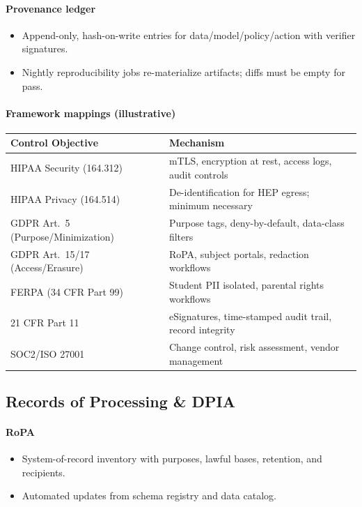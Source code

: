 \documentclass[11pt]{article}
\theoremstyle{plain}
\begin{document}
\paragraph{Provenance ledger}
\begin{itemize}
  \item Append-only, hash-on-write entries for data/model/policy/action with verifier signatures.
  \item Nightly reproducibility jobs re-materialize artifacts; diffs must be empty for pass.
\end{itemize}

\paragraph{Framework mappings (illustrative)}
\begin{center}
\begin{tabular}{l l}
\hline
\textbf{Control Objective} & \textbf{Mechanism} \\
\hline
HIPAA Security (164.312) & mTLS, encryption at rest, access logs, audit controls \\
HIPAA Privacy (164.514) & De-identification for HEP egress; minimum necessary \\
GDPR Art.~5 (Purpose/Minimization) & Purpose tags, deny-by-default, data-class filters \\
GDPR Art.~15/17 (Access/Erasure) & RoPA, subject portals, redaction workflows \\
FERPA (34 CFR Part 99) & Student PII isolated, parental rights workflows \\
21 CFR Part 11 & eSignatures, time-stamped audit trail, record integrity \\
SOC2/ISO 27001 & Change control, risk assessment, vendor management \\
\hline
\end{tabular}
\end{center}

\subsection{Records of Processing \& DPIA}
\paragraph{RoPA}
\begin{itemize}
  \item System-of-record inventory with purposes, lawful bases, retention, and recipients.
  \item Automated updates from schema registry and data catalog.
\end{itemize}
\end{document}
